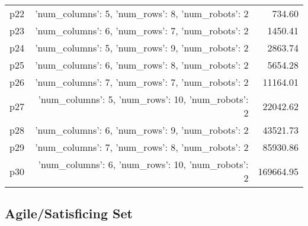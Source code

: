 \documentclass{article}
\begin{document}
\begin{center}
\begin{tabular}{@{}l|r|r@{}}
  p22&{'num\_columns': 5, 'num\_rows': 8, 'num\_robots': 2}&734.60\\
  p23&{'num\_columns': 6, 'num\_rows': 7, 'num\_robots': 2}&1450.41\\
  p24&{'num\_columns': 5, 'num\_rows': 9, 'num\_robots': 2}&2863.74\\
  p25&{'num\_columns': 6, 'num\_rows': 8, 'num\_robots': 2}&5654.28\\
  p26&{'num\_columns': 7, 'num\_rows': 7, 'num\_robots': 2}&11164.01\\
  p27&{'num\_columns': 5, 'num\_rows': 10, 'num\_robots': 2}&22042.62\\
  p28&{'num\_columns': 6, 'num\_rows': 9, 'num\_robots': 2}&43521.73\\
  p29&{'num\_columns': 7, 'num\_rows': 8, 'num\_robots': 2}&85930.86\\
  p30&{'num\_columns': 6, 'num\_rows': 10, 'num\_robots': 2}&169664.95
                            \end{tabular}
                            \end{center}
                    

                                \subsection*{Agile/Satisficing Set}
                                
\end{document}
